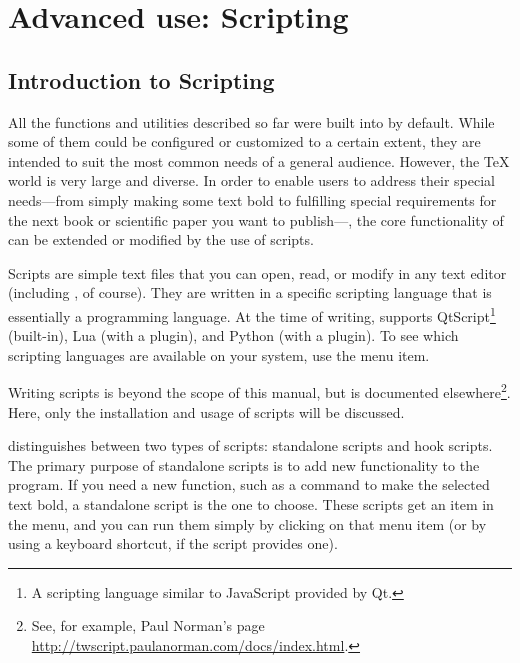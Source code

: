 
\chapter{Advanced use: Scripting}

\section{Introduction to Scripting}

All the functions and utilities described so far were built into {\Tw} by default. While some of them could be configured or customized to a certain extent, they are intended to suit the most common needs of a general audience. However, the {\TeX} world is very large and diverse. In order to enable users to address their special needs---from simply making some text bold to fulfilling special requirements for the next book or scientific paper you want to publish---, the core functionality of {\Tw} can be extended or modified by the use of scripts.

Scripts are simple text files that you can open, read, or modify in any text editor (including {\Tw}, of course). They are written in a specific scripting language that is essentially a programming language. At the time of writing, {\Tw} supports QtScript\footnote{A scripting language similar to JavaScript provided by Qt.} (built-in), Lua (with a plugin), and Python (with a plugin). To see which scripting languages are available on your system, use the \submenu{}\submenu{} menu item.

Writing scripts is beyond the scope of this manual, but is documented elsewhere\footnote{See, for example, Paul Norman's page \url{http://twscript.paulanorman.com/docs/index.html}.}. Here, only the installation and usage of scripts will be discussed.

{\Tw} distinguishes between two types of scripts: standalone scripts and hook scripts. The primary purpose of standalone scripts is to add new functionality to the program. If you need a new function, such as a command to make the selected text bold, a standalone script is the one to choose. These scripts get an item in the  menu, and you can run them simply by clicking on that menu item (or by using a keyboard shortcut, if the script provides one).

